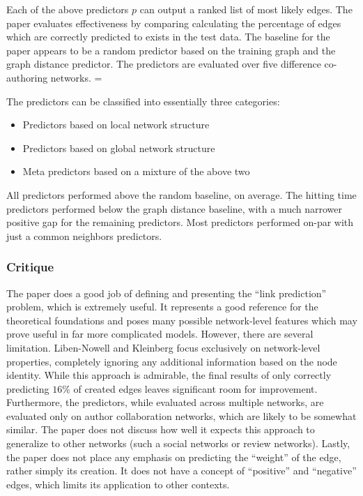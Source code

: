 \documentclass[letterpaper, 11 pt, conference]{ieeeconf}  %
\begin{document}
Each of the above predictors $p$ can output a ranked list of most likely edges. The paper evaluates effectiveness by comparing calculating the percentage of edges which are correctly predicted to exists in the test data. The baseline for the paper appears to be a random predictor based on the training graph and the graph distance predictor. The predictors are evaluated over five difference co-authoring networks. =

The predictors can be classified into essentially three categories:

\begin{itemize}
\item Predictors based on local network structure
\item Predictors based on global network structure
\item Meta predictors based on a mixture of the above two 
\end{itemize}

All predictors performed above the random baseline, on average. The hitting time predictors performed below the graph distance baseline, with a much narrower positive gap for the remaining predictors. Most predictors performed on-par with just a common neighbors predictors.


\subsubsection{Critique}

The paper does a good job of defining and presenting the ``link prediction'' problem, which is extremely useful. It represents a good reference for the theoretical foundations and poses many possible network-level features which may prove useful in far more complicated models. However, there are several limitation. Liben-Nowell and Kleinberg focus exclusively on network-level properties, completely ignoring any additional information based on the node identity. While this approach is admirable, the final results of only correctly predicting $16$\% of created edges leaves significant room for improvement. Furthermore, the predictors, while evaluated across multiple networks, are evaluated only on author collaboration networks, which are likely to be somewhat similar. The paper does not discuss how well it expects this approach to generalize to other networks (such a social networks or review networks). Lastly, the paper does not place any emphasis on predicting the ``weight'' of the edge, rather simply its creation. It does not have a concept of ``positive'' and ``negative'' edges, which limits its application to other contexts. 
\end{document}
